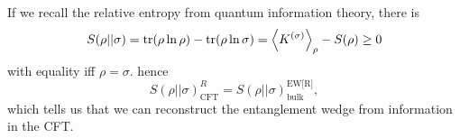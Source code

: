 If we recall the relative entropy from quantum information theory, there is
\begin{equation}
    S(\rho||\sigma)=\operatorname{tr}(\rho\ln\rho)-\operatorname{tr}(\rho\ln\sigma)= \left< K^{(\sigma)} \right>_\rho -S(\rho) \geq 0
\end{equation}
with equality iff $\rho=\sigma$. hence
\begin{equation}
    S(\rho||\sigma)_\text{CFT}^R = S(\rho||\sigma)_\text{bulk}^\text{EW[R]},
\end{equation}
which tells us that we can reconstruct the entanglement wedge from information in the CFT.